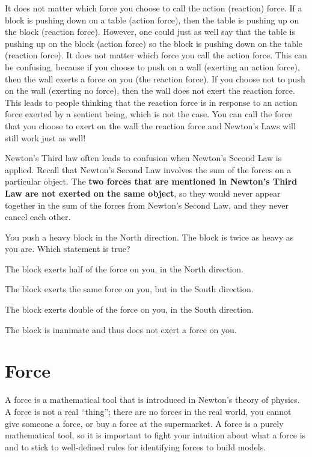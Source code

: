 It does not matter which force you choose to call the action (reaction) force. If a block is pushing down on a table (action force), then the table is pushing up on the block (reaction force). However, one could just as well say that the table is pushing up on the block (action force) so the block is pushing down on the table (reaction force). It does not matter which force you call the action force. This can be confusing, because if you choose to push on a wall (exerting an action force), then the wall exerts a force on you (the reaction force). If you choose not to push on the wall (exerting no force), then the wall does not exert the reaction force. This leads to people thinking that the reaction force is in response to an action force exerted by a sentient being, which is not the case. You can call the force that you choose to exert on the wall the reaction force and Newton's Laws will still work just as well!

Newton's Third law often leads to confusion when Newton's Second Law is applied. Recall that Newton's Second Law involves the sum of the forces on a particular object. The \textbf{two forces that are mentioned in Newton's Third Law are not exerted on the same object}, so they would never appear together in the sum of the forces from Newton's Second Law, and they never cancel each other. 

\begin{checkpoint}
\begin{MCquestion}{You push a heavy block in the North direction. The block is twice as heavy as you are. Which statement is true?}
\item The block exerts half of the force on you, in the North direction.
\item The block exerts the same force on you, but in the South direction. %
\item The block exerts double of the force on you, in the South direction.
\item The block is inanimate and thus does not exert a force on you. 
\end{MCquestion}
\end{checkpoint}

\section{Force}
A force is a mathematical tool that is introduced in Newton's theory of physics. A force is not a real ``thing''; there are no forces in the real world, you cannot give someone a force, or buy a force at the supermarket. A force is a purely mathematical tool, so it is important to fight your intuition about what a force is and to stick to well-defined rules for identifying forces to build models.

